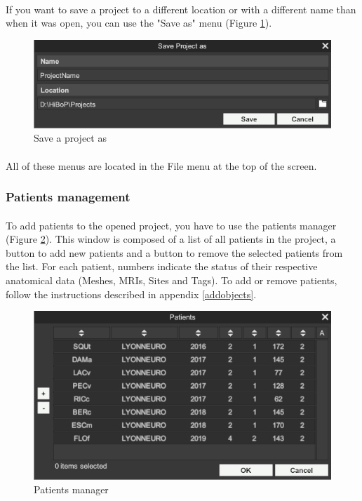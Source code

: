 \documentclass[a4paper]{article}
\begin{document}
\paragraph{} If you want to save a project to a different location or with a different name than when it was open, you can use the "Save as" menu (Figure \ref{saveProjectUI}).
\begin{figure}[H]
\begin{center}
\includegraphics[scale=0.5]{SaveAs.png}
\end{center}
\caption{\label{saveProjectUI}Save a project as}
\end{figure}
\paragraph{} All of these menus are located in the File menu at the top of the screen.
\subsubsection{Patients management}
\paragraph{} To add patients to the opened project, you have to use the patients manager (Figure \ref{patientGestionUI}). This window is composed of a list of all patients in the project, a button to add new patients and a button to remove the selected patients from the list. For each patient, numbers indicate the status of their respective anatomical data (Meshes, MRIs, Sites and Tags). To add or remove patients, follow the instructions described in appendix \ref{addobjects}.
\begin{figure}[H]
\begin{center}
\includegraphics[scale=0.5]{PatientGestion.png}
\end{center}
\caption{\label{patientGestionUI}Patients manager}
\end{figure}
\end{document}
